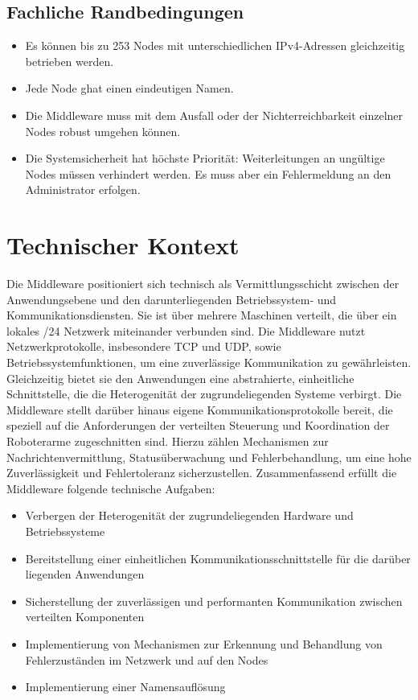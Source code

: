 \subsection{Fachliche Randbedingungen}

\begin{itemize}
	\item Es können bis zu 253 Nodes mit unterschiedlichen IPv4-Adressen gleichzeitig betrieben werden.
	\item Jede Node ghat einen eindeutigen Namen.
	\item Die Middleware muss mit dem Ausfall oder der Nichterreichbarkeit einzelner Nodes robust umgehen können.
	\item Die Systemsicherheit hat höchste Priorität: Weiterleitungen an ungültige Nodes müssen verhindert werden. Es muss aber ein Fehlermeldung an den Administrator erfolgen. 
\end{itemize}

\section{Technischer Kontext}

Die Middleware positioniert sich technisch als Vermittlungsschicht zwischen der Anwendungsebene und den darunterliegenden Betriebssystem- und Kommunikationsdiensten. Sie ist über mehrere Maschinen verteilt, die über ein lokales /24 Netzwerk miteinander verbunden sind.
Die Middleware nutzt Netzwerkprotokolle, insbesondere TCP und UDP, sowie Betriebssystemfunktionen, um eine zuverlässige Kommunikation zu gewährleisten. Gleichzeitig bietet sie den Anwendungen eine abstrahierte, einheitliche Schnittstelle, die die Heterogenität der zugrundeliegenden Systeme verbirgt.
Die Middleware stellt darüber hinaus eigene Kommunikationsprotokolle bereit, die speziell auf die Anforderungen der verteilten Steuerung und Koordination der Roboterarme zugeschnitten sind. Hierzu zählen Mechanismen zur Nachrichtenvermittlung, Statusüberwachung und Fehlerbehandlung, um eine hohe Zuverlässigkeit und Fehlertoleranz sicherzustellen.
Zusammenfassend erfüllt die Middleware folgende technische Aufgaben:
\begin{itemize}
	\item Verbergen der Heterogenität der zugrundeliegenden Hardware und Betriebssysteme
	\item Bereitstellung einer einheitlichen Kommunikationsschnittstelle für die darüber liegenden Anwendungen
	\item Sicherstellung der zuverlässigen und performanten Kommunikation zwischen verteilten Komponenten
	\item Implementierung von Mechanismen zur Erkennung und Behandlung von Fehlerzuständen im Netzwerk und auf den Nodes
	\item Implementierung einer Namensauflösung
\end{itemize}

